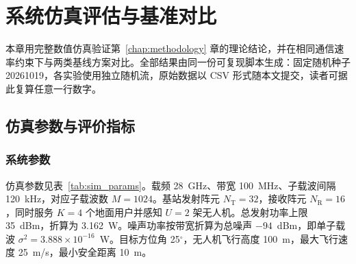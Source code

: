 \chapter{系统仿真评估与基准对比}
\label{chap:exp}

本章用完整数值仿真验证第~\ref{chap:methodology} 章的理论结论，并在相同通信速率约束下与两类基线方案对比。全部结果由同一份可复现脚本生成：固定随机种子 20261019，各实验使用独立随机流，原始数据以 CSV 形式随本文提交，读者可据此复算任意一行数字。

\section{仿真参数与评价指标}
\label{sec:exp_setup}

\subsection{系统参数}
\label{sec:sim_params}

仿真参数见表~\ref{tab:sim_params}。载频 28~GHz、带宽 100~MHz、子载波间隔 120~kHz，对应子载波数 $M=1024$。基站发射阵元 $N_{\mathrm{T}}=32$，接收阵元 $N_{\mathrm{R}}=16$，同时服务 $K=4$ 个地面用户并感知 $U=2$ 架无人机。总发射功率上限 35~dBm，折算为 3.162~W。噪声功率按带宽折算为总噪声 $-94$~dBm，即单子载波 $\sigma^{2}=3.888\times10^{-16}$~W。目标方位角 25$^{\circ}$，无人机飞行高度 100~m，最大飞行速度 25~m/s，最小安全距离 10~m。

